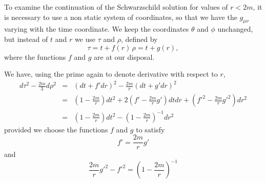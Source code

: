 To examine the continuation of the Schwarzschild solution for values of $r < 2 m$, it is necessary to use a non static 
system of coordinates, so that we have  the $g_{\mu\nu}$ varying with the time coordinate. We keep the coordinates 
$\theta$ and $\phi$ unchanged, but instead of $t$ and $r$ we use $\tau$ and $\rho$, defined by
\begin{equation}
 \label{ecuacion 19.1}
 \tau = t + f(r)\, \rho = t + g(r),
\end{equation}
where the functions $f$ and $g$ are at our disposal.

We have, using the prime again to denote derivative with respect to $r$,
\begin{equation}
 \label{ecuacion 19.2}
 \begin{array}{rcl}
   d\tau^2 - \frac{2 m}{3} d\rho^2 & = & (d t + f' dr)^2 - \frac{2 m}{r}(dt + g' dr)^2 \\
   & = & \left( 1 - \frac{2m}{r} \right)dt^2 + 2 \left( f' - \frac{2m}{r} g' \right) dt dr   
   + \left( f'^2 - \frac{2m}{r} g'^2 \right)dr^2\\
   & = & \left(1 - \frac{2m}{r}\right)dt^2 - \left(1 - \frac{2m}{r}\right)^{-1} dr^2
 \end{array}
\end{equation}
provided we choose the functions $f$ and $g$ to satisfy
\begin{equation}
 \label{ecuacion 19.3}
 f' = \frac{2 m}{r} g'
\end{equation}
and
\begin{equation}
 \label{ecuacion 19.4}
 \frac{2m}{r}g'^2 - f'^2 = \left(1 - \frac{2m}{r}\right)^{-1}
\end{equation}







